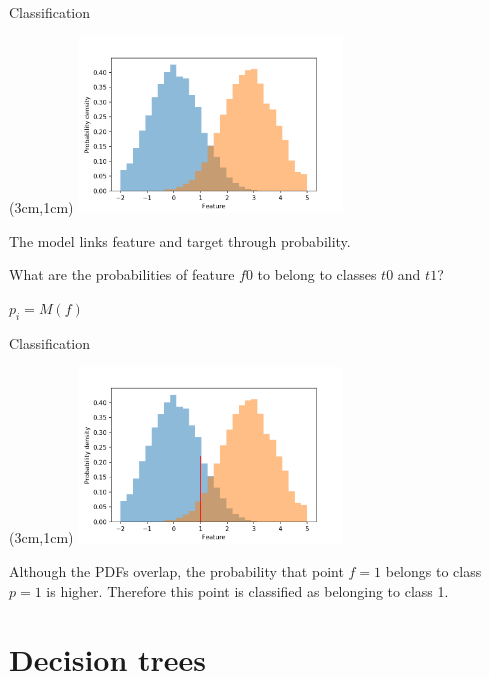 \documentclass[handout, 10pt]{beamer}
\begin{document}
\begin{frame}{Classification}
\begin{textblock*}{8cm}(3cm,1cm) %
\includegraphics[width=7cm]{figs/classification_1.png}

The model links feature and target through probability. 

What are the probabilities of feature $f0$ to belong to classes $t0$ and $t1$?

$p_i = M(f)$
\end{textblock*}
\end{frame}

\begin{frame}{Classification}
\begin{textblock*}{8cm}(3cm,1cm) %
\includegraphics[width=7cm]{figs/classification_2.png}

Although the PDFs overlap, the probability that point $f=1$ belongs to class $p=1$ is higher. Therefore this point is classified as belonging to class 1.
\end{textblock*}
\end{frame}

\section{Decision trees}
\end{document}
